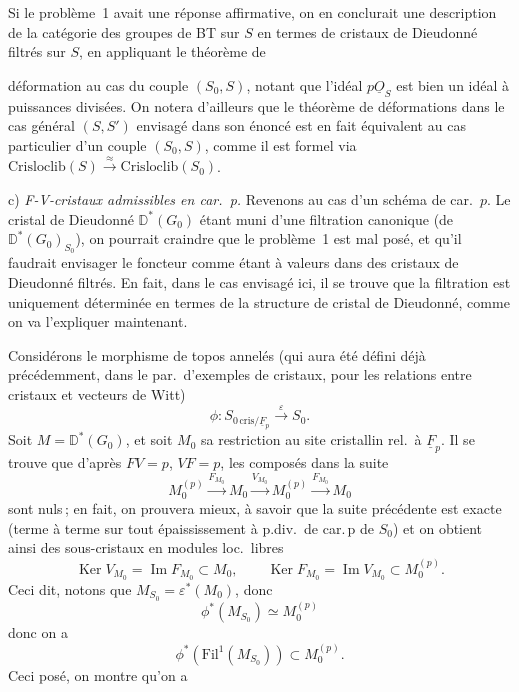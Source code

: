 \documentclass[11pt,a4paper]{article}
\begin{document}

Si le  problème~1 avait une réponse affirmative, on en conclurait une description de la catégorie des groupes de BT sur $S$ en termes de cristaux de Dieudonné filtrés sur $S$, en appliquant le théorème de

déformation au cas du couple $(S_0, S)$, \struck{\ill{}} notant que l'idéal $p\underline{O}_S$ est bien un idéal à puissances divisées. On notera d'ailleurs que le théorème de déformations dans le cas  général $(S,S')$ envisagé dans son énoncé est en fait équivalent au cas particulier d'un couple $(S_0,S)$, comme il est formel via $\mathrm{Crisloclib}(S) \xrightarrow{\approx} \mathrm{Crisloclib}(S_0)$.


c) \emph{F-V-cristaux admissibles en car.\ p.} Revenons au cas d'un schéma de car.\ $p$. Le cristal de Dieudonné $\mathbb{D}^*(G_0)$ étant muni d'une filtration canonique (de $\mathbb{D}^*(G_0)_{S_0}$), on pourrait craindre que le problème~1 est mal posé, et qu'il faudrait envisager le foncteur comme étant à valeurs dans des cristaux de Dieudonné filtrés. En fait, dans le cas envisagé ici, il se trouve que la filtration est uniquement déterminée en termes de la structure de cristal de Dieudonné, comme on va l'expliquer maintenant.

Considérons le morphisme de topos annelés (qui aura été défini déjà précédemment, dans le par.\ d'exemples de cristaux, pour les relations entre cristaux et vecteurs de Witt)
\[
  \phi : S_{0\,\mathrm{cris}/\underline{F}_p} \overset{\varepsilon}{\longrightarrow} S_0 .
\]
Soit $M = \mathbb{D}^*(G_0)$, et soit $M_0$ sa restriction au site cristallin rel.\ à $\underline{F}_p$. Il se trouve que  d'après $FV = p$, $VF = p$, les composés dans la suite
\[
  M_0^{(p)} \xrightarrow{F_{M_0}} M_0 \xrightarrow{V_{M_0}} M_0^{(p)} \xrightarrow{F_{M_0}} M_0
\]
sont nuls\,; en fait, on prouvera mieux, à savoir que  la suite précédente est exacte (terme à terme sur tout épaississement à p.div.\ de car.\,p de $S_0$) et on obtient ainsi des sous-cristaux en modules loc.\ libres
\[
  \operatorname{Ker} V_{M_0} = \operatorname{Im} F_{M_0} \subset M_0 , \qquad
  \operatorname{Ker} F_{M_0} = \operatorname{Im} V_{M_0} \subset M_0^{(p)} .
\]
Ceci dit,  notons que $M_{S_0} = \varepsilon^*(M_0)$, donc
\[
  \phi^*(M_{S_0}) \simeq M_0^{(p)}
\]
donc on a
\[
  \phi^*(\mathrm{Fil}^1(M_{S_0})) \subset M_0^{(p)} .
\]
Ceci posé, on montre qu'on a
\end{document}
